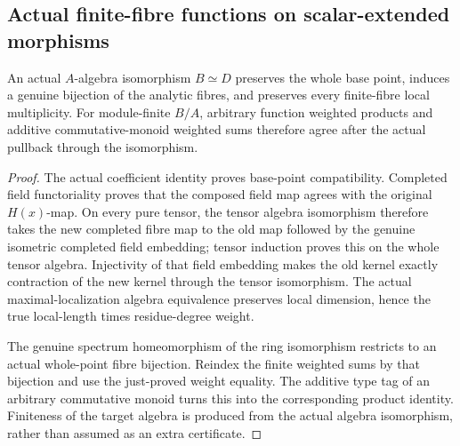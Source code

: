 \subsection{Actual finite-fibre functions on scalar-extended morphisms}
\label{subsec:finite-fibre-scalar-extension}

\begin{theorem}
\label{spectrum:finite-fibre-algebra-isomorphism}
\leanok
{}
An actual $A$-algebra isomorphism $B\simeq D$ preserves the whole base point,
induces a genuine bijection of the analytic fibres, and preserves every
finite-fibre local multiplicity. For module-finite $B/A$, arbitrary function
weighted products and additive commutative-monoid weighted sums therefore
agree after the actual pullback through the isomorphism.
\end{theorem}
\begin{proof}
The actual coefficient identity proves base-point compatibility. Completed
field functoriality proves that the composed field map agrees with the
original $H(x)$-map. On every pure tensor, the tensor algebra isomorphism
therefore takes the new completed fibre map to the old map followed by the
genuine isometric completed field embedding; tensor induction proves this
on the whole tensor algebra. Injectivity of that field embedding makes the
old kernel exactly contraction of the new kernel through the tensor
isomorphism. The actual maximal-localization algebra equivalence preserves
local dimension, hence the true local-length times residue-degree weight.

The genuine spectrum homeomorphism of the ring isomorphism restricts to
an actual whole-point fibre bijection. Reindex the finite weighted sums by
that bijection and use the just-proved weight equality. The additive type
tag of an arbitrary commutative monoid turns this into the corresponding
product identity. Finiteness of the target algebra is produced from the
actual algebra isomorphism, rather than assumed as an extra certificate.
\end{proof}

